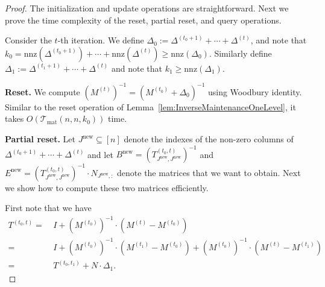 \documentclass[11pt]{article}
\newcommand{\Tmat}{\mathcal{T}_{\mathrm{mat}}}
\newcommand{\nnz}{\mathrm{nnz}}
\newcommand{\new}{\mathrm{new}}
\newcommand\BB{\boldsymbol{\mathit{B}}}
\newcommand\EE{\boldsymbol{\mathit{E}}}
\newcommand\II{\boldsymbol{\mathit{I}}}
\newcommand\NN{\boldsymbol{\mathit{N}}}
\newcommand\MM{\boldsymbol{\mathit{M}}}
\newcommand\TT{\boldsymbol{\mathit{T}}}
\begin{document}
\begin{proof}
The initialization and update operations are straightforward. Next we prove the time complexity of the reset, partial reset, and query operations.

Consider the $t$-th iteration. We define $\Delta_0 := \Delta^{(t_0+1)} + \cdots + \Delta^{(t)}$, and note that $k_0 = \nnz(\Delta^{(t_0+1)}) + \cdots + \nnz(\Delta^{(t)}) \geq \nnz(\Delta_0)$. Similarly define $\Delta_1 := \Delta^{(t_1+1)} + \cdots + \Delta^{(t)}$ and note that $k_1 \geq \nnz(\Delta_1)$.


{\bf Reset.} We compute $(\MM^{(t)})^{-1} = (\MM^{(t_0)} + \Delta_0)^{-1}$ using Woodbury identity. Similar to the reset operation of Lemma~\ref{lem:InverseMaintenanceOneLevel}, it takes $O(\Tmat(n,n,k_0))$ time.

{\bf Partial reset.} Let $J^{\new} \subseteq [n]$ denote the indexes of the non-zero columns of $\Delta^{(t_0+1)} + \cdots + \Delta^{(t)}$ and let $\BB^{\new} = (\TT^{(t_0,t)}_{J^{\new},J^{\new}})^{-1}$ and $\EE^{\new} = (\TT^{(t_0,t)}_{J^{\new},J^{\new}})^{-1} \cdot \NN_{J^{\new},:}$ denote the matrices that we want to obtain. Next we show how to compute these two matrices efficiently.


First note that we have
\begin{align*}
\TT^{(t_0,t)} = &~ \II + (\MM^{(t_0)})^{-1} \cdot (\MM^{(t)} - \MM^{(t_0)}) \\
= &~ \II + (\MM^{(t_0)})^{-1} \cdot (\MM^{(t_1)} - \MM^{(t_0)}) + (\MM^{(t_0)})^{-1} \cdot (\MM^{(t)} - \MM^{(t_1)}) \\
= &~ \TT^{(t_0,t_1)} + \NN \cdot \Delta_1.
\end{align*}


\end{proof}
\end{document}
